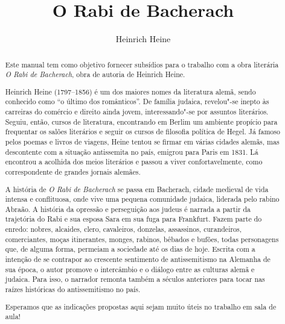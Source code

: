 \documentclass[12pt]{extarticle}
\begin{document}
\newcommand{\AutorLivro}{Heinrich Heine}
\newcommand{\TituloLivro}{O Rabi de Bacherach}
\newcommand{\Tema}{Ficção, mistério e fantasia}
\newcommand{\Genero}{Romance}
\newcommand{\imagemCapa}{./images/PNLD0018-01.png}
\newcommand{\issnppub}{978-65-551908-5-4}
\newcommand{\issnepub}{978-65-551908-4-7}
\newcommand{\colaborador}{{Michelle Etienne Florence, Bruno Gradella e Vicente Castro}}


\title{\TituloLivro}
\author{\AutorLivro}
\def\authornotes{\colaborador}

\date{}
\maketitle

\baselineskip\par

\begin{abstract}

Este manual tem como objetivo fornecer subsídios para o trabalho com a
obra literária \emph{O Rabi de Bacherach}, obra de autoria de Heinrich
Heine.

Heinrich Heine (1797--1856) é um dos maiores nomes da literatura alemã,
sendo conhecido como ``o último dos românticos''.
De família judaica, revelou"-se inepto às carreiras do comércio e direito ainda 
jovem, interessando"-se por assuntos literários. Seguiu, então, cursos de 
literatura, encontrando em Berlim um ambiente propício para frequentar os salões 
literários e seguir os cursos de filosofia política de Hegel.
Já famoso pelos poemas e livros de viagens, Heine tentou se firmar em várias
cidades alemãs, mas descontente com a situação antissemita no país, emigrou
para Paris em 1831. Lá encontrou a acolhida dos meios literários e passou a
viver confortavelmente, como correspondente de grandes jornais alemães.

A história de \textit{O Rabi de Bacherach} se passa em Bacherach, cidade medieval 
de vida intensa e conflituosa, onde vive uma pequena comunidade judaica, liderada pelo
rabino Abraão. A história da opressão e perseguição aos judeus é narrada a
partir da trajetória do Rabi e sua esposa Sara em sua fuga para Frankfurt.
Fazem parte do enredo: nobres, alcaides, clero, cavaleiros, donzelas, assassinos, 
curandeiros, comerciantes, moças itinerantes, monges, rabinos, bêbados e bufões, 
todas personagens que, de alguma forma, permeiam a sociedade até os dias de hoje.
Escrita com a intenção de se contrapor ao crescente sentimento de antissemitismo
na Alemanha de sua época, o autor promove o intercâmbio e o diálogo entre as culturas 
alemã e judaica. Para isso, o narrador remonta também a séculos anteriores para tocar 
nas raízes históricas do antissemitismo no país.

Esperamos que as indicações propostas aqui sejam muito úteis no trabalho em
sala de aula! 


\end{abstract}
\end{document}
